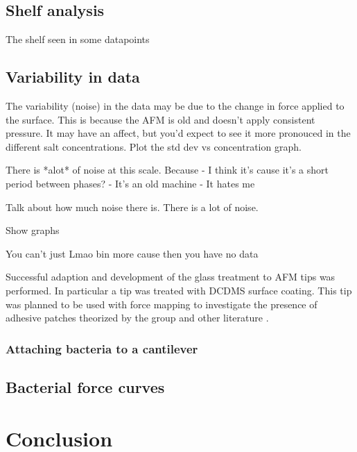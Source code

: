 \section{Shelf analysis}

The shelf seen in some datapoints 

\section{Variability in data}

The variability (noise) in the data may be due to the change in force applied to the surface. This is because the AFM is old and doesn't apply consistent pressure. It may have an affect, but you'd expect to see it more pronouced in the different salt concentrations. Plot the std dev vs concentration graph.

There is *alot* of noise at this scale. Because 
- I think it's cause it's a short period between phases?
- It's an old machine
- It hates me

Talk about how much noise there is. There is a lot of noise.

Show graphs

You can't just Lmao bin more cause then you have no data




Successful adaption and development of the glass treatment to AFM tips was performed. In particular a tip was treated with DCDMS surface coating. This tip was planned to be used with force mapping to investigate the presence of adhesive patches theorized by the group \cite{Teun1} and other literature \cite{Patchy}. 

\subsection{Attaching bacteria to a cantilever}
\newpage

\section{Bacterial force curves}

\newpage
\newpage
\newpage

\chapter{Conclusion}